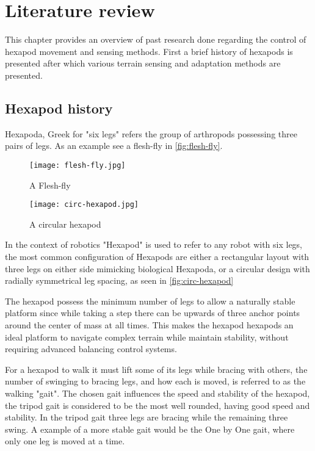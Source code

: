 \chapter{Literature review}
This chapter provides an overview of past research done regarding the control of hexapod movement and sensing methods. First a brief history of hexapods is presented
after which various terrain sensing and adaptation methods are presented.

\section{Hexapod history}
Hexapoda, Greek for "six legs" refers the group of arthropods possessing three pairs of legs. As an example see a flesh-fly in \autoref{fig:flesh-fly}.

\begin{figure}[h]
    \centering
    \begin{minipage}{.5\textwidth}
        \centering
        \texttt{[image: flesh-fly.jpg]}
        \caption{A Flesh-fly}
        \label{fig:flesh-fly}
    \end{minipage}%
    \begin{minipage}{.5\textwidth}
        \centering
        \texttt{[image: circ-hexapod.jpg]}
        \caption{A circular hexapod}
        \label{fig:circ-hexapod}  
    \end{minipage}
\end{figure}

In the context of robotics "Hexapod" is used to refer to any robot with six legs, the most common configuration of Hexapods are either a rectangular
layout with three legs on either side mimicking biological Hexapoda, or a circular design with radially symmetrical leg spacing,
as seen in \autoref{fig:circ-hexapod}

The hexapod possess the minimum number of legs to allow a naturally stable platform since while taking a step there can be upwards of three anchor points around the center of mass at all times.
This makes the hexapod hexapods an ideal platform to navigate complex terrain while maintain stability, without requiring advanced balancing control systems.

For a hexapod to walk it must lift some of its legs while bracing with others, the number of swinging to bracing legs, and how each is moved, is referred to as the walking "gait".
The chosen gait influences the speed and stability of the hexapod, the tripod gait is considered to be the most well rounded, having good speed and stability.
In the tripod gait three legs are bracing while the remaining three swing. A example of a more stable gait would be the One by One gait, where only one leg is moved at a time.

